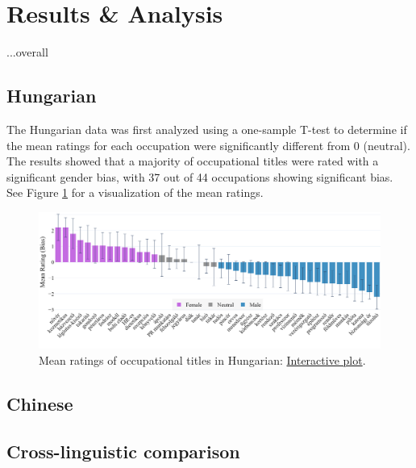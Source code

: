 \documentclass[11pt]{article}
\begin{document}

\section{Results \& Analysis}

...overall

\subsection{Hungarian}

The Hungarian data was first analyzed using a one-sample T-test to determine if the mean ratings for each occupation were significantly different from 0 (neutral). The results showed that a majority of occupational titles were rated with a significant gender bias, with 37 out of 44 occupations showing significant bias. See Figure \ref{fig:occupations_hu} for a visualization of the mean ratings.


\begin{figure}[ht]
  \centering
  \includegraphics[width=\linewidth]{../occupations_hu}
  \caption{Mean ratings of occupational titles in Hungarian: \href{https://htmlpreview.github.io/?https://github.com/partigabor/occupational-bias/blob/main/occupations_hu.html}{Interactive plot}.}
  \label{fig:occupations_hu}
\end{figure}

\subsection{Chinese}

\subsection{Cross-linguistic comparison}

\end{document}
